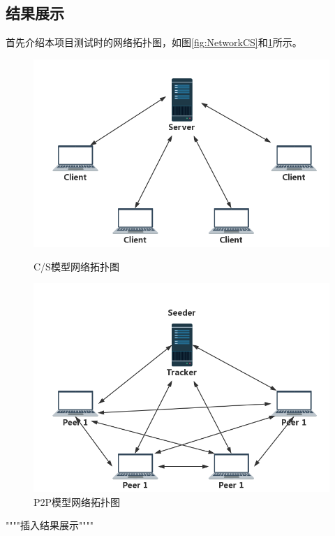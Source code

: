 \documentclass[15pt]{ctexart}
\begin{document}
\subsection{结果展示} %
\label{sub:结果展示}
首先介绍本项目测试时的网络拓扑图，如图\ref{fig:NetworkCS}和\ref{fig:NetworkP2P}所示。
\begin{figure}[H]
\begin{minipage}{0.48\linewidth}
	\centering
	\includegraphics[width=0.9\linewidth]{imgs/NetworkCS.png}
	\caption{C/S模型网络拓扑图}
	\label{fig:NetworkCS}
	\end{minipage}
	\centering
	\begin{minipage}{0.48\linewidth}
	\includegraphics[width=0.9\linewidth]{imgs/NetworkP2P.png}
	\caption{P2P模型网络拓扑图}
	\label{fig:NetworkP2P}
	\end{minipage}
\end{figure}
\par """"插入结果展示""""
\\
\\
\\
\\
\\
\\
\\
\\
\\
\\
\\
\end{document}
